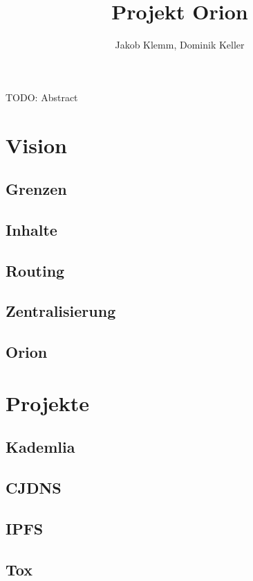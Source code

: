 \documentclass[11pt]{report}
\author{Jakob Klemm, Dominik Keller}
\date{}
\title{Projekt Orion}
\begin{document}
\maketitle
\tableofcontents

\newpage

\begin{ABSTRACT}
TODO: Abstract
\end{ABSTRACT}
\part{Vision}
\label{sec:org0c3a096}
\chapter{Grenzen}
\label{sec:org798d4c8}
\chapter{Inhalte}
\label{sec:org1aa51fd}
\chapter{Routing}
\label{sec:orge9eca75}
\chapter{Zentralisierung}
\label{sec:org4a9692c}
\chapter{Orion}
\label{sec:orgb7e959c}
\part{Projekte}
\label{sec:org7842b33}
\chapter{Kademlia}
\label{sec:org3bead5f}
\chapter{CJDNS}
\label{sec:org224f5ac}
\chapter{IPFS}
\label{sec:orgd717ae0}
\chapter{Tox}
\label{sec:orgbf2ef87}
\end{document}
